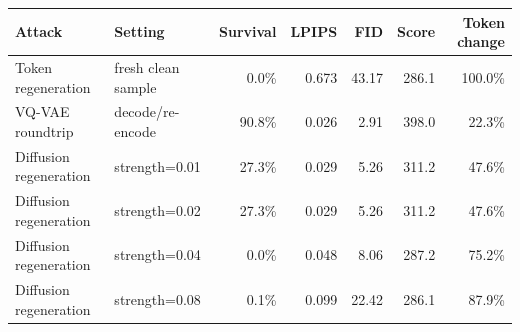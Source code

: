 \begin{tabular}{llrrrrr}
\toprule
Attack & Setting & Survival & LPIPS & FID & Score & Token change \\
\midrule
Token regeneration & fresh clean sample & 0.0\% & 0.673 & 43.17 & 286.1 & 100.0\% \\
VQ-VAE roundtrip & decode/re-encode & 90.8\% & 0.026 & 2.91 & 398.0 & 22.3\% \\
Diffusion regeneration & strength=0.01 & 27.3\% & 0.029 & 5.26 & 311.2 & 47.6\% \\
Diffusion regeneration & strength=0.02 & 27.3\% & 0.029 & 5.26 & 311.2 & 47.6\% \\
Diffusion regeneration & strength=0.04 & 0.0\% & 0.048 & 8.06 & 287.2 & 75.2\% \\
Diffusion regeneration & strength=0.08 & 0.1\% & 0.099 & 22.42 & 286.1 & 87.9\% \\
\bottomrule
\end{tabular}
